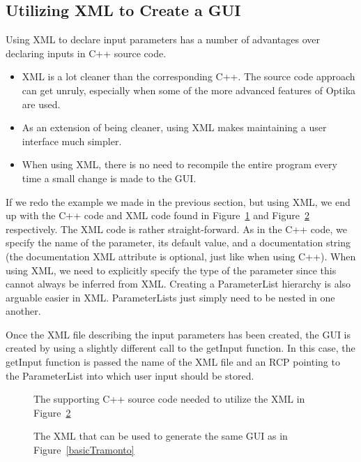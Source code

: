\subsection{Utilizing XML to Create a GUI}
Using XML to declare input parameters has a number of advantages over declaring inputs in C++ source code.
\begin{itemize}
  \item XML is a lot cleaner than the corresponding C++. The source code approach can get unruly, especially
  when some of the more advanced features of Optika are used.
  \item As an extension of being cleaner, using XML makes maintaining a user interface much simpler.
  \item When using XML, there is no need to recompile the entire program every time a small change is made to the GUI.
\end{itemize}
If we redo the example we made in the previous section, but using XML, we end up with the C++ code and XML code found in
Figure~\ref{basicXMLC++} and Figure~\ref{basicXMLXML} respectively. The XML code is rather straight-forward. As in the C++ code, we specify 
the name of the parameter, its default value, and a documentation string (the documentation XML attribute is optional, just like when using 
C++). When using XML, we need to explicitly specify the type
of the parameter since this cannot always be inferred from XML. Creating a ParameterList hierarchy is also arguable easier
in XML. ParameterLists just simply need to be nested in one another.

Once the XML file describing the input parameters has been created, the GUI is created by using a slightly different
call to the getInput function. In this case, the getInput function is passed the name of the XML file and an RCP pointing
to the ParameterList into which user input should be stored.
\begin{figure}
{\footnotesize
\centering
{}
}
\caption{The supporting C++ source code needed to utilize the XML in Figure~\ref{basicXMLXML}}
\label{basicXMLC++}
\end{figure}
\begin{figure}
{\footnotesize
\centering
{}
}
\caption{The XML that can be used to generate the same GUI as in Figure~\ref{basicTramonto}}
\label{basicXMLXML}
\end{figure}

